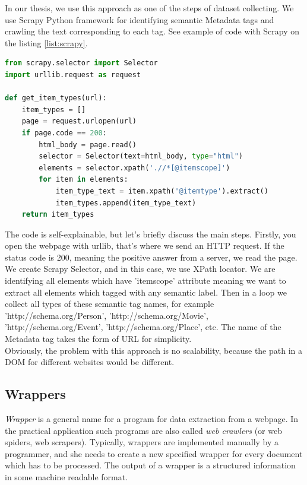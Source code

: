 In our thesis, we use this approach as one of the steps of dataset collecting. We use Scrapy Python framework \cite{Scrapy} for identifying semantic Metadata tags and crawling the text corresponding to each tag. See example of code with Scrapy on the listing \ref{list:scrapy}.\\

\begin{lstlisting}[language=Python, caption={Example of meta tag text scrapping with Scrapy Python framework}, label={list:scrapy}, captionpos=b]
from scrapy.selector import Selector
import urllib.request as request

def get_item_types(url):
    item_types = []
    page = request.urlopen(url)
    if page.code == 200:
        html_body = page.read()
        selector = Selector(text=html_body, type="html")
        elements = selector.xpath('.//*[@itemscope]')
        for item in elements:
            item_type_text = item.xpath('@itemtype').extract()
            item_types.append(item_type_text)
    return item_types 
\end{lstlisting}

The code is self-explainable, but let's briefly discuss the main steps. Firstly, you open the webpage with urllib, that's where we send an HTTP request. If the status code is 200, meaning the positive answer from a server, we read the page. We create Scrapy Selector, and in this case, we use XPath locator. We are identifying all elements which have 'itemscope' attribute meaning we want to extract all elements which tagged with any semantic label. Then in a loop we collect all types of these semantic tag names, for example 'http://schema.org/Person', 'http://schema.org/Movie', 'http://schema.org/Event', 'http://schema.org/Place', etc. The name of the Metadata tag takes the form of URL for simplicity. \\

Obviously, the problem with this approach is no scalability, because the path in a DOM for different websites would be different. \\

\subsection{Wrappers}

\textit{Wrapper} is a general name for a program for data extraction from a webpage. In the practical application such programs are also called \textit{web crawlers} (or web spiders, web scrapers). Typically, wrappers are implemented manually by a programmer, and she needs to create a new specified wrapper for every document which has to be processed. The output of a wrapper is a structured information in some machine readable format. \\

